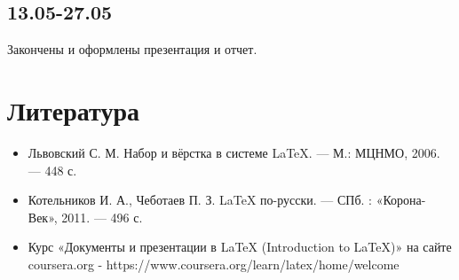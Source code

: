\documentclass{article}
\begin{document}
	\subsection*{13.05-27.05}
	
	Закончены и оформлены презентация и отчет. 
	
	\section{Литература}
	
	\begin{itemize}
		\item Львовский С. М. Набор и вёрстка в системе LaTeX. — М.: МЦНМО,
		 2006. — 448 с.
		 \item Котельников И. А., Чеботаев П. З. LaTeX по-русски. — СПб. : «Корона-Век», 2011. — 496 с.
		 \item Курс «Документы и презентации в LaTeX (Introduction to LaTeX)» на сайте coursera.org - https://www.coursera.org/learn/latex/home/welcome
	\end{itemize}
\end{document}
